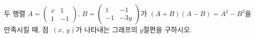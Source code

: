 \hspace*{2mm}\begin{minipage}[t]{\dimexpr\linewidth-2mm\relax}\vspace{0pt}
두 행렬 $A=\begin{pmatrix} x & 1 \\ 1 & -1 \end{pmatrix}$, $B=\begin{pmatrix} 1 & -1 \\ -1 & -3y \end{pmatrix}$가 $(A+B)(A-B)=A^2-B^2$을 만족시킬 때, 점~$(x,\,y)$가 나타내는 그래프의 $y$절편을 구하시오.\end{minipage}
